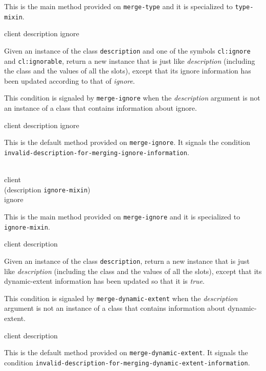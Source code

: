 This is the main method provided on \texttt{merge-type}
and it is specialized to \texttt{type-mixin}.

{\footnotesize
{} {client description ignore}
}

Given an instance of the class \texttt{description} and one
of the symbols \texttt{cl:ignore} and \texttt{cl:ignorable},
return a new instance that is just like
\textit{description} (including the class and the values of
all the slots), except that its ignore information has been updated
according to that of \textit{ignore}.

{\footnotesize
{}
}

This condition is signaled by \texttt{merge-ignore} when the
\textit{description} argument is not an instance of a class that
contains information about ignore.

{\footnotesize
{} {client description ignore}
}

This is the default method provided on \texttt{merge-ignore}.  It
signals the condition
\texttt{invalid-description-for-merging-ignore-information}.

{\footnotesize
{}\\
           {client\\
            (description {\tt ignore-mixin})\\
            ignore}
}

This is the main method provided on \texttt{merge-ignore}
and it is specialized to \texttt{ignore-mixin}.

{\footnotesize
{} {client description}
}

Given an instance of the class \texttt{description}, return a
new instance that is just like \textit{description}
(including the class and the values of all the slots), except that its
dynamic-extent information has been updated so that it is \emph{true}.

{\footnotesize
{}
}

This condition is signaled by \texttt{merge-dynamic-extent} when the
\textit{description} argument is not an instance of a class that
contains information about dynamic-extent.

{\footnotesize
{} {client description}
}

This is the default method provided on \texttt{merge-dynamic-extent}.  It
signals the condition
\texttt{invalid-description-for-merging-dynamic-extent-information}.

